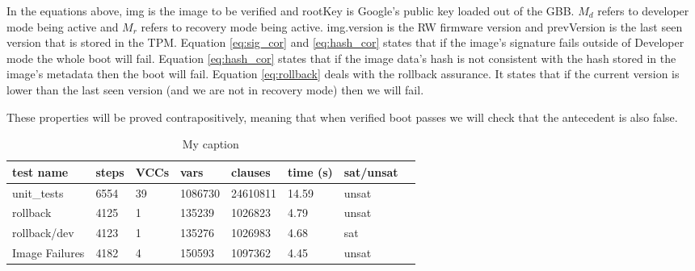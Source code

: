\documentclass[../report.tex]{subfiles}
\begin{document}
In the equations above, img is the image to be verified and rootKey is Google's public key loaded out of the GBB.
$M_d$ refers to developer mode being active and $M_r$ refers to recovery mode being active.
img.version is the RW firmware version and prevVersion is the last seen version that is stored in the TPM.
Equation \ref{eq:sig_cor} and \ref{eq:hash_cor} states that if the image's signature fails outside of Developer mode the whole boot will fail.
Equation \ref{eq:hash_cor} states that if the image data's hash is not consistent with the hash stored in the image's metadata then the boot will fail.
Equation \ref{eq:rollback} deals with the rollback assurance. It states that if the current version is lower than the last seen version (and we are not in recovery mode) then we will fail.

These properties will be proved contrapositively, meaning that when verified boot passes we will check that the antecedent is also false.

\begin{table}[]
    \centering
    \caption{My caption}
    \label{my-label}
    \begin{tabular}{|l|l|l|l|l|l|l|l|}
        \hline
        test name & steps & VCCs & vars  & clauses & time (s) & sat/unsat  \\ \hline \hline
        unit\_tests & 6554 & 39 & 1086730 & 24610811 & 14.59 & unsat \\ \hline
        rollback  & 4125 & 1 & 135239 & 1026823 & 4.79 & unsat \\ \hline
        rollback/dev & 4123 & 1 & 135276 & 1026983 & 4.68 & sat \\ \hline
        Image Failures & 4182 & 4 & 150593 & 1097362 & 4.45 & unsat \\ \hline
    \end{tabular}
\end{table}
\end{document}
